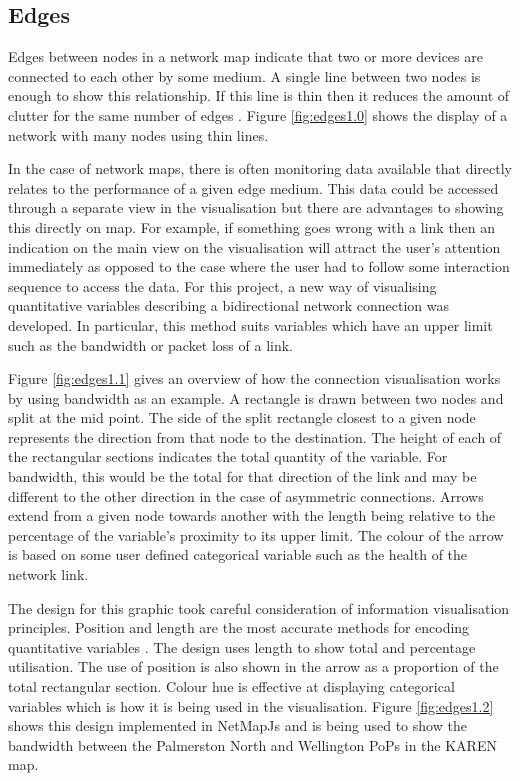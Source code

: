 \documentclass[11pt, a4paper]{article}
\begin{document}
\subsection{Edges}
\label{sec:edges.vis}

Edges between nodes in a network map indicate that two or more devices are
connected to each other by some medium. A single line between two nodes is
enough to show this relationship. If this line is thin then it reduces the
amount of clutter for the same number of edges \cite{Tufte_2007}. Figure
\ref{fig:edges1.0} shows the display of a network with many nodes using thin
lines.

In the case of network maps, there is often monitoring data available that
directly relates to the performance of a given edge medium. This data could be
accessed through a separate view in the visualisation but there are advantages
to showing this directly on map. For example, if something goes wrong with a
link then an indication on the main view on the visualisation will attract the
user's attention immediately as opposed to the case where the user had to follow
some interaction sequence to access the data. For this project, a new way of
visualising quantitative variables describing a bidirectional network connection
was developed. In particular, this method suits variables which have an upper
limit such as the bandwidth or packet loss of a link.

Figure \ref{fig:edges1.1} gives an overview of how the connection visualisation
works by using bandwidth as an example. A rectangle is drawn between two nodes
and split at the mid point. The side of the split rectangle closest to a given
node represents the direction from that node to the destination. The height of
each of the rectangular sections indicates the total quantity of the variable.
For bandwidth, this would be the total for that direction of the link and may be
different to the other direction in the case of asymmetric connections. Arrows
extend from a given node towards another with the length being relative to the
percentage of the variable's proximity to its upper limit.  The colour of the
arrow is based on some user defined categorical variable such as the health of
the network link.

The design for this graphic took careful consideration of information
visualisation principles. Position and length are the most accurate methods for
encoding quantitative variables \cite{Spence_2007}. The design uses length to
show total and percentage utilisation. The use of position is also shown in the
arrow as a proportion of the total rectangular section. Colour hue is effective
at displaying categorical variables which is how it is being used in the
visualisation. Figure \ref{fig:edges1.2} shows this design implemented in
NetMapJs and is being used to show the bandwidth between the Palmerston North
and Wellington PoPs in the KAREN map.
\end{document}
